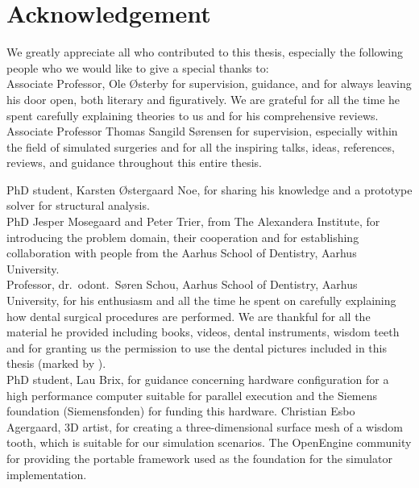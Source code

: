 
\chapter*{Acknowledgement}
We greatly appreciate all who contributed to this thesis,
especially the following people who we would like to give a special
thanks to: \\ 

Associate Professor, Ole Østerby for supervision, guidance, and
for always leaving his door open, both literary and figuratively. We
are grateful for all the time he spent carefully explaining theories
to us and for his comprehensive reviews. 
%
Associate Professor Thomas Sangild Sørensen for supervision, especially within the field
of simulated surgeries and for all the inspiring talks, ideas,
references, reviews, and guidance throughout this entire thesis.

%
PhD student, Karsten Østergaard Noe, for sharing his knowledge and
a prototype solver for structural analysis. \\

PhD Jesper Mosegaard and Peter Trier, from The Alexandera
Institute, for introducing the problem domain, their cooperation and
for establishing collaboration with people from the Aarhus School of
Dentistry, Aarhus University. \\

Professor, dr.~odont.~Søren Schou, Aarhus School of Dentistry, Aarhus
University, for his enthusiasm and all the time he spent on carefully
explaining how dental surgical procedures are performed. We are
thankful for all the material he provided including books, videos,
dental instruments, wisdom teeth and for granting us the permission to
use the dental pictures included in this thesis (marked by \textdagger). \\

PhD student, Lau Brix, for guidance concerning hardware
configuration for a high performance computer suitable for parallel
execution
%
and the Siemens foundation (Siemensfonden) for funding this
hardware.
%
Christian Esbo Agergaard, 3D artist, for creating a three-dimensional
surface mesh of a wisdom tooth, which is suitable for our simulation
scenarios.
%
The OpenEngine community for providing the portable framework used as
the foundation for the simulator implementation.
